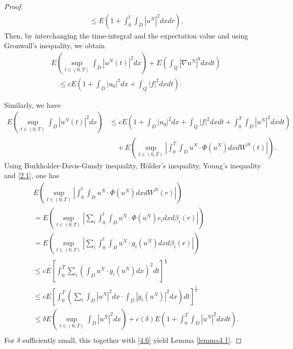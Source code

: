 \documentclass[reqno]{amsart}
\theoremstyle{definition}
\theoremstyle{remark}
\numberwithin{equation}{section} \allowdisplaybreaks
\begin{document}
\begin{proof}
\begin{equation*}
\begin{split}
&\leq E\left(1+\int_0^t\!\!\!\int_D|u^N|^2dxdr\right).
\end{split}
\end{equation*}
Then, by interchanging the time-integral and the expectation value
and using Gronwall's inequality, we obtain
\begin{equation}\label{4.6}
\begin{split}
&E\left(\sup_{t\in(0,T)}\int_{D}|u^N(t)|^2dx\right)+E\left(\int_{Q}|\nabla u^N|^qdxdt\right)\\
&\quad\leq cE\left(1+\int_{D}|u_0|^2dx+\int_Q|f|^2dxdt\right).
\end{split}
\end{equation}


Similarly, we have
\begin{equation}\label{4.7}
\begin{split}
E\left(\sup_{t\in(0,T)}\int_{D}|u^N(t)|^2dx\right)&\leq
cE\left(1+\int_{D}|u_0|^2dx+\int_Q|f|^2dxdt
+\int_0^T\!\!\!\int_{D}|u^N|^2dxdt\right)\\
&\quad+E\left(\sup_{t\in(0,T)}\left|\int_0^T\!\!\!\int_Du^N\cdot
\Phi(u^N)dxdW^N(t)\right|\right).
\end{split}
\end{equation}
Using Burkholder-Davis-Gundy inequality, H\"{o}lder's inequality,
Young's inequality and \eqref{2.1}, one has
\begin{align*}
&E\left(\sup_{t\in(0,T)}\left|\int_0^t\!\!\!\int_Du^N\cdot \Phi(u^N)dxdW^N(r)\right|\right)\\
&=E\left(\sup_{t\in(0,T)}\left|\sum_{i}\int_0^t\!\!\!\int_Du^N\cdot \Phi(u^N)e_idxd\beta_i(r)\right|\right)\\
&=E\left(\sup_{t\in(0,T)}\left|\sum_{i}\int_0^t\!\!\!\int_Du^N\cdot g_i(u^N)dxd\beta_i(r)\right|\right)\\
&\leq cE\left[\int_0^T\sum_{i}\left(\int_Du^N\cdot g_i(u^N)dx\right)^2dt\right]^{\frac{1}{2}}\\
&\leq cE\left[\int_0^T\left(\sum_{i}\int_D|u^N|^2dx \cdot\int_D|g_i(u^N)|^2dx\right)dt\right]^{\frac{1}{2}}\\
&\leq \delta E\left(\sup_{t\in(0,T)}\int_D|u^N|^2dx\right)+c(\delta)E\left(1+\int_0^T\int_D|u^N|^2dxdt\right).\\
\end{align*}
For $\delta$ sufficiently small, this together with \eqref{4.6}
yield Lemma \ref{lemma4.1}.
\end{proof}
\end{document}
